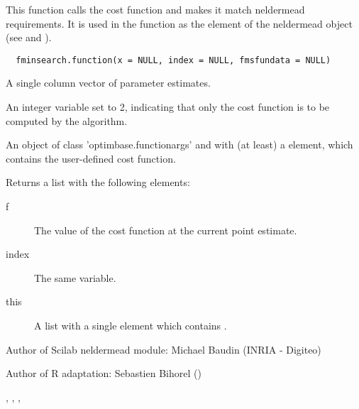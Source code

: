%
\begin{Description}\relax
This function calls the cost function and makes it match neldermead
requirements. It is used in the  function as the
 element of the neldermead object (see 
and ). 
\end{Description}
%
\begin{Usage}
\begin{verbatim}
  fminsearch.function(x = NULL, index = NULL, fmsfundata = NULL)
\end{verbatim}
\end{Usage}
%
\begin{Arguments}
\begin{ldescription}
\item[\code{x}] A single column vector of parameter estimates.
\item[\code{index}] An integer variable set to 2, indicating that only the cost
function is to be computed by the algorithm.
\item[\code{fmsfundata}] An object of class 'optimbase.functionargs' and with 
(at least) a  element, which contains the user-defined cost 
function.
\end{ldescription}
\end{Arguments}
%
\begin{Value}
Returns a list with the following elements: \begin{description}

\item[f] The value of the cost function at the current point estimate.
\item[index] The same  variable.
\item[this] A list with a single element  which
contains .

\end{description}

\end{Value}
%
\begin{Author}\relax
Author of Scilab neldermead module: Michael Baudin (INRIA - Digiteo)

Author of R adaptation: Sebastien Bihorel ()
\end{Author}
%
\begin{SeeAlso}\relax
{},
,
,
\end{SeeAlso}
